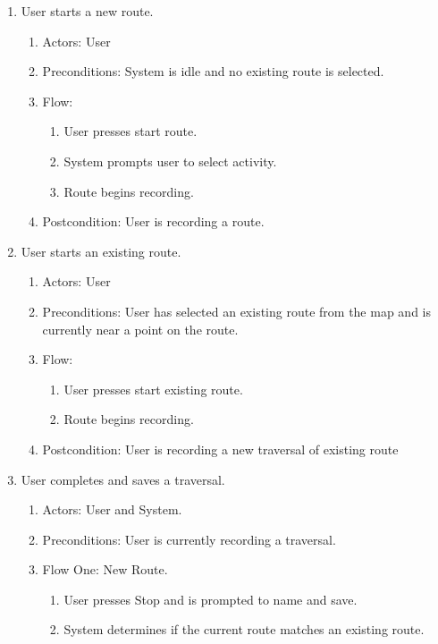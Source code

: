 \documentclass{article}
\begin{document}
\begin{enumerate}
\item User starts a new route.
    \begin{enumerate}
        \item Actors: User
        \item Preconditions: System is idle and no existing route is selected.
        \item Flow:
            \begin{enumerate}
                \item User presses start route.
                \item System prompts user to select activity.
                \item Route begins recording.
            \end{enumerate}
        \item Postcondition: User is recording a route.
    \end{enumerate}
\item User starts an existing route.
    \begin{enumerate}
        \item Actors: User
        \item Preconditions: User has selected an existing route from the map and is currently near       a point on the route.
        \item Flow:
            \begin{enumerate}
                \item User presses start existing route.
                \item Route begins recording.
            \end{enumerate}
        \item Postcondition: User is recording a new traversal of existing route
    \end{enumerate}
\item User completes and saves a traversal.
    \begin{enumerate}
        \item Actors: User and System.
        \item Preconditions: User is currently recording a traversal.
        \item Flow One: New Route.
            \begin{enumerate}
            \item User presses Stop and is prompted to name and save.
            \item System determines if the current route matches an existing route.

\end{enumerate}
\end{enumerate}
\end{enumerate}
\end{document}

